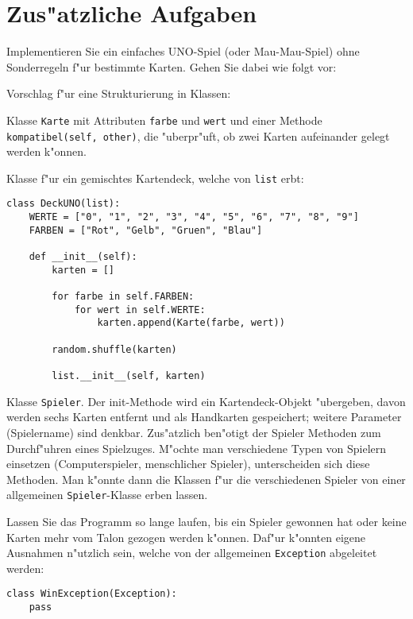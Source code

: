 \section*{Zus"atzliche Aufgaben}

\begin{aufgabe}
Implementieren Sie ein einfaches UNO-Spiel (oder Mau-Mau-Spiel) ohne Sonderregeln f"ur bestimmte Karten. Gehen Sie dabei wie folgt vor:

\begin{teilaufgabe}[Grundlagen]
Vorschlag f"ur eine Strukturierung in Klassen:
\begin{auflistung}
\item Klasse \lstinline{Karte} mit Attributen \lstinline{farbe} und \lstinline{wert} und einer Methode \lstinline{kompatibel(self, other)}, die "uberpr"uft, ob zwei Karten aufeinander gelegt werden k"onnen.
\item Klasse f"ur ein gemischtes Kartendeck, welche von \lstinline{list} erbt:
\begin{lstlisting}
class DeckUNO(list):
    WERTE = ["0", "1", "2", "3", "4", "5", "6", "7", "8", "9"]
    FARBEN = ["Rot", "Gelb", "Gruen", "Blau"]

    def __init__(self):
        karten = []

        for farbe in self.FARBEN:
            for wert in self.WERTE:
                karten.append(Karte(farbe, wert))

        random.shuffle(karten)

        list.__init__(self, karten)
\end{lstlisting}
\item Klasse \lstinline{Spieler}. Der init-Methode wird ein Kartendeck-Objekt "ubergeben, davon werden sechs Karten entfernt und als Handkarten gespeichert; weitere Parameter (Spielername) sind denkbar. Zus"atzlich ben"otigt der Spieler Methoden zum Durchf"uhren eines Spielzuges. M"ochte man verschiedene Typen von Spielern einsetzen (Computerspieler, menschlicher Spieler), unterscheiden sich diese Methoden. Man k"onnte dann die Klassen f"ur die verschiedenen Spieler von einer allgemeinen \lstinline{Spieler}-Klasse erben lassen.
\end{auflistung}
Lassen Sie das Programm so lange laufen, bis ein Spieler gewonnen hat oder keine Karten mehr vom Talon gezogen werden k"onnen. Daf"ur k"onnten eigene Ausnahmen n"utzlich sein, welche von der allgemeinen \lstinline{Exception} abgeleitet werden:
\begin{lstlisting}
class WinException(Exception):
    pass


\end{lstlisting}
\end{teilaufgabe}
\end{aufgabe}
